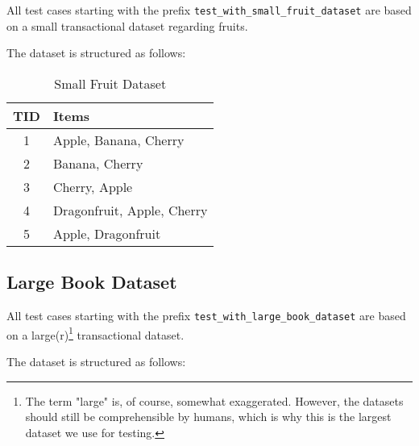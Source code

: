 \documentclass[
english,
smallborders
]{i6prcsht}
\begin{document}
All test cases starting with the prefix \texttt{test\_with\_small\_fruit\_dataset} are based on a small transactional dataset regarding fruits.

The dataset is structured as follows:

\vspace*{1cm}

\begin{table}[ht]
	\centering
	\begin{tabular}{|c|l|}
		\hline
		\textbf{TID} & \textbf{Items}             \\
		\hline
		1            & Apple, Banana, Cherry      \\
		\hline
		2            & Banana, Cherry             \\
		\hline
		3            & Cherry, Apple              \\
		\hline
		4            & Dragonfruit, Apple, Cherry \\
		\hline
		5            & Apple, Dragonfruit         \\
		\hline
	\end{tabular}
	\caption{Small Fruit Dataset}
	\label{tab:small-fruit-dataset}
\end{table}

\vspace*{1cm}

\subsection*{Large Book Dataset}

All test cases starting with the prefix \texttt{test\_with\_large\_book\_dataset} are based on a large(r)\footnote{The term "large" is, of course, somewhat exaggerated. However, the datasets should still be comprehensible by humans, which is why this is the largest dataset we use for testing.} transactional dataset.

The dataset is structured as follows:

\vspace*{1cm}
\end{document}

